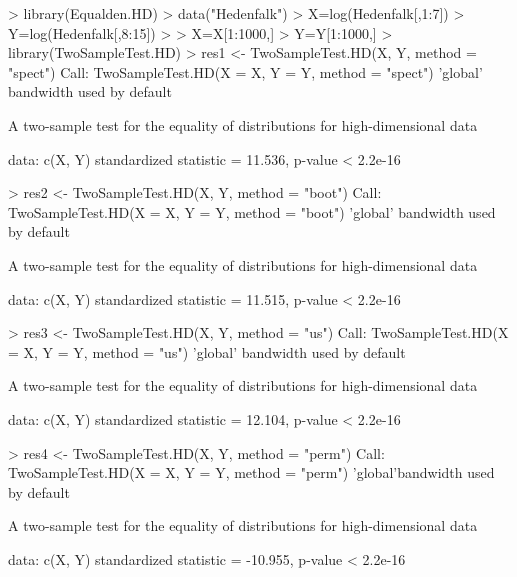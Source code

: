 \begin{example}
	> library(Equalden.HD)
	> data("Hedenfalk")
	> X=log(Hedenfalk[,1:7])
	> Y=log(Hedenfalk[,8:15])
	> 
	> X=X[1:1000,]
	> Y=Y[1:1000,]
	> library(TwoSampleTest.HD)
	> res1 <- TwoSampleTest.HD(X, Y, method = "spect")
	Call: 
	TwoSampleTest.HD(X = X, Y = Y, method = "spect")
	'global' bandwidth used by default
	
	A two-sample test for the equality of distributions for high-dimensional data
	
	data:  c(X, Y)
	standardized statistic = 11.536, p-value < 2.2e-16
	
	> res2 <- TwoSampleTest.HD(X, Y, method = "boot")
	Call: 
	TwoSampleTest.HD(X = X, Y = Y, method = "boot")
	'global' bandwidth used by default
	
	A two-sample test for the equality of distributions for high-dimensional data
	
	data:  c(X, Y)
	standardized statistic = 11.515, p-value < 2.2e-16
	
	> res3 <- TwoSampleTest.HD(X, Y, method = "us")
	Call: 
	TwoSampleTest.HD(X = X, Y = Y, method = "us")
	'global' bandwidth used by default
	
	A two-sample test for the equality of distributions for high-dimensional data
	
	data:  c(X, Y)
	standardized statistic = 12.104, p-value < 2.2e-16
	
	> res4 <- TwoSampleTest.HD(X, Y, method = "perm")
	Call: 
	TwoSampleTest.HD(X = X, Y = Y, method = "perm")
	'global'bandwidth used by default
	
	A two-sample test for the equality of distributions for high-dimensional data
	
	data:  c(X, Y)
	standardized statistic = -10.955, p-value < 2.2e-16
	
\end{example}


